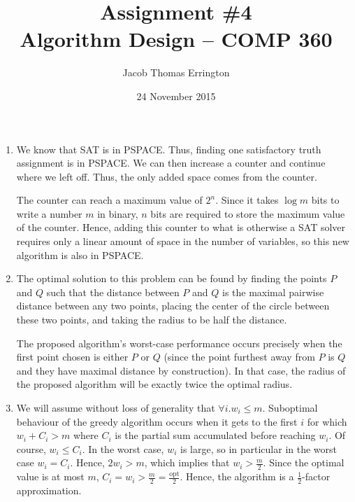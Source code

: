 \documentclass[letterpaper,11pt]{article}
\author{Jacob Thomas Errington}
\title{Assignment \#4\\Algorithm Design -- COMP 360}
\date{24 November 2015}
\begin{document}
\maketitle

\begin{enumerate}
    \item
        We know that SAT is in PSPACE. Thus, finding one satisfactory truth
        assignment is in PSPACE. We can then increase a counter and continue
        where we left off. Thus, the only added space comes from the counter.

        The counter can reach a maximum value of $2^n$. Since it takes $\log m$
        bits to write a number $m$ in binary, $n$ bits are required to store
        the maximum value of the counter. Hence, adding this counter to what is
        otherwise a SAT solver requires only a linear amount of space in the
        number of variables, so this new algorithm is also in PSPACE.

    \item
        The optimal solution to this problem can be found by finding the points
        $P$ and $Q$ such that the distance between $P$ and $Q$ is the maximal
        pairwise distance between any two points, placing the center of the
        circle between these two points, and taking the radius to be half the
        distance.

        The proposed algorithm's worst-case performance occurs precisely when
        the first point chosen is either $P$ or $Q$ (since the point furthest
        away from $P$ is $Q$ and they have maximal distance by construction).
        In that case, the radius of the proposed algorithm will be exactly
        twice the optimal radius.

    \item
        We will assume without loss of generality that $\forall i. w_i \leq m$.
        Suboptimal behaviour of the greedy algorithm occurs when it gets to the
        first $i$ for which $w_i + C_i > m$ where $C_i$ is the partial sum
        accumulated before reaching $w_i$. Of course, $w_i \leq C_i$. In the
        worst case, $w_i$ is large, so in particular in the worst case
        $w_i = C_i$. Hence, $2w_i > m$, which implies that $w_i > \frac{m}{2}$.
        Since the optimal value is at most $m$,
        $C_i = w_i > \frac{m}{2} = \frac{\mathrm{opt}}{2}$. Hence, the algorithm
        is a $\frac{1}{2}$-factor approximation.


\end{enumerate}
\end{document}
